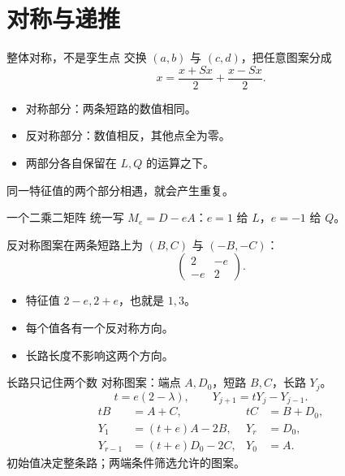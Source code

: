 \documentclass{beamer}
\begin{document}
\section{对称与递推}
\begin{frame}{整体对称，不是孪生点}
交换 $(a,b)$ 与 $(c,d)$，把任意图案分成
\[
x=\frac{x+Sx}{2}+\frac{x-Sx}{2}.
\]
\begin{itemize}
\item 对称部分：两条短路的数值相同。
\item 反对称部分：数值相反，其他点全为零。
\item 两部分各自保留在 $L,Q$ 的运算之下。
\end{itemize}
同一特征值的两个部分相遇，就会产生重复。
\end{frame}
\begin{frame}{一个二乘二矩阵}
统一写 $M_e=D-eA$：$e=1$ 给 $L$，$e=-1$ 给 $Q$。

反对称图案在两条短路上为 $(B,C)$ 与 $(-B,-C)$：
\[
\begin{pmatrix}2&-e\\-e&2\end{pmatrix}.
\]
\begin{itemize}
\item 特征值 $2-e,2+e$，也就是 $1,3$。
\item 每个值各有一个反对称方向。
\item 长路长度不影响这两个方向。
\end{itemize}
\end{frame}
\begin{frame}{长路只记住两个数}
对称图案：端点 $A,D_0$，短路 $B,C$，长路 $Y_j$。
\[
t=e(2-\lambda),\qquad Y_{j+1}=tY_j-Y_{j-1}.
\]
\[
\begin{aligned}
tB&=A+C,&tC&=B+D_0,\\
Y_1&=(t+e)A-2B,&Y_r&=D_0,\\
Y_{r-1}&=(t+e)D_0-2C,&Y_0&=A.
\end{aligned}
\]
初始值决定整条路；两端条件筛选允许的图案。
\end{frame}
\end{document}
